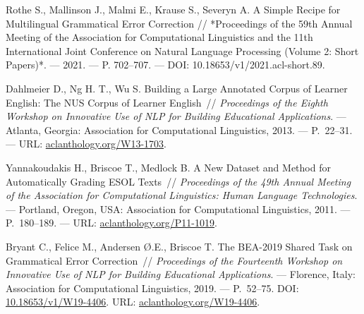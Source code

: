 \begin{thebibliography}{99}
Rothe S., Mallinson J., Malmi E., Krause S., Severyn A.  
A Simple Recipe for Multilingual Grammatical Error Correction // *Proceedings of the 59th Annual Meeting of the Association for Computational Linguistics and the 11th International Joint Conference on Natural Language Processing (Volume 2: Short Papers)*. — 2021. — P. 702–707. — DOI: 10.18653/v1/2021.acl-short.89.

Dahlmeier D., Ng H. T., Wu S.  
Building a Large Annotated Corpus of Learner English: The NUS Corpus of Learner English~//  
\textit{Proceedings of the Eighth Workshop on Innovative Use of NLP for Building Educational Applications}. — Atlanta, Georgia: Association for Computational Linguistics, 2013. — P.~22--31. — URL: \href{https://aclanthology.org/W13-1703}{aclanthology.org/W13-1703}.

Yannakoudakis H., Briscoe T., Medlock B.  
A New Dataset and Method for Automatically Grading ESOL Texts~//  
\textit{Proceedings of the 49th Annual Meeting of the Association for Computational Linguistics: Human Language Technologies}. — Portland, Oregon, USA: Association for Computational Linguistics, 2011. — P.~180--189. — URL: \href{https://aclanthology.org/P11-1019}{aclanthology.org/P11-1019}.

Bryant C., Felice M., Andersen {\O}.E., Briscoe T.  
The BEA-2019 Shared Task on Grammatical Error Correction~//  
\textit{Proceedings of the Fourteenth Workshop on Innovative Use of NLP for Building Educational Applications}. — Florence, Italy: Association for Computational Linguistics, 2019. — P.~52--75.  
DOI: \href{https://doi.org/10.18653/v1/W19-4406}{10.18653/v1/W19-4406}.  
URL: \href{https://aclanthology.org/W19-4406}{aclanthology.org/W19-4406}.



\end{thebibliography}




